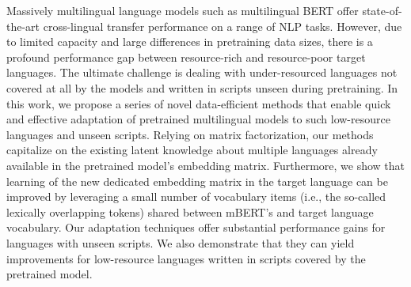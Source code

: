 Massively multilingual language models such as multilingual BERT offer state-of-the-art cross-lingual transfer performance on a range of NLP tasks. However, due to limited capacity and large differences in pretraining data sizes, there is a profound performance gap between resource-rich and resource-poor target languages.  The ultimate challenge is dealing with under-resourced languages not covered at all by the models and written in scripts unseen during pretraining. In this work, we propose a series of novel data-efficient methods that enable quick and effective adaptation of pretrained multilingual models to such low-resource languages and unseen scripts. Relying on matrix factorization, our methods capitalize on the existing latent knowledge about multiple languages already available in the pretrained model's embedding matrix. Furthermore, we show that learning of the new dedicated embedding matrix in the target language can be improved by leveraging a small number of vocabulary items (i.e., the so-called lexically overlapping tokens) shared between mBERT's and target language vocabulary. Our adaptation techniques offer substantial performance gains for languages with unseen scripts. We also demonstrate that they can yield improvements for low-resource languages written in scripts covered by the pretrained model.
